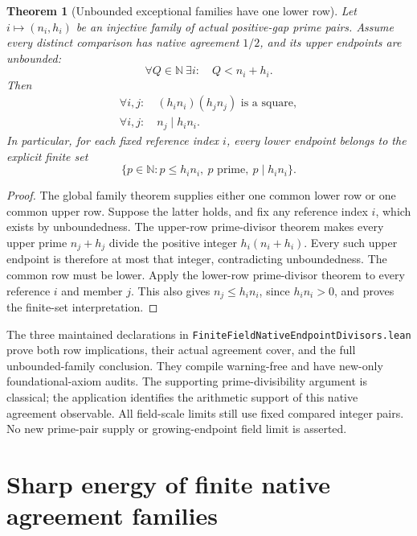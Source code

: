 \documentclass[11pt]{article}
\newtheorem{theorem}{Theorem}[section]
\begin{document}
\begin{theorem}[Unbounded exceptional families have one lower row]
\label{thm:native-unbounded-lower-row}
Let \(i\mapsto(n_i,h_i)\) be an injective family of actual
positive-gap prime pairs. Assume every distinct comparison has
native agreement \(1/2\), and its upper endpoints are unbounded:
\[
 \forall Q\in\mathbb N\ \exists i:\quad Q<n_i+h_i.
\]
Then
\[
 \begin{gathered}
 \forall i,j:\quad (h_i n_i)(h_j n_j)\text{ is a square},\\
 \forall i,j:\quad n_j\mid h_i n_i.
 \end{gathered}
\]
In particular, for each fixed reference index \(i\), every lower
endpoint belongs to the explicit finite set
\[
 \{p\in\mathbb N: p\le h_i n_i,\ p\text{ prime},\ p\mid h_i n_i\}.
\]
\end{theorem}

\begin{proof}
The global family theorem supplies either one common lower row
or one common upper row. Suppose the latter holds, and fix any
reference index \(i\), which exists by unboundedness.
The upper-row prime-divisor theorem makes every upper prime
\(n_j+h_j\) divide the positive integer \(h_i(n_i+h_i)\).
Every such upper endpoint is therefore at most that integer,
contradicting unboundedness.
The common row must be lower. Apply the lower-row prime-divisor
theorem to every reference \(i\) and member \(j\).
This also gives \(n_j\le h_i n_i\), since \(h_i n_i>0\),
and proves the finite-set interpretation.
\end{proof}

The three maintained declarations in
\texttt{FiniteFieldNativeEndpointDivisors.\allowbreak lean}
prove both row implications, their actual agreement cover,
and the full unbounded-family conclusion.
They compile warning-free and have new-only foundational-axiom
audits. The supporting prime-divisibility argument is classical;
the application identifies the arithmetic support of this
native agreement observable.
All field-scale limits still use fixed compared integer pairs.
No new prime-pair supply or growing-endpoint field limit is asserted.

\section{Sharp energy of finite native agreement families}
\label{sec:native-agreement-energy}
\end{document}
